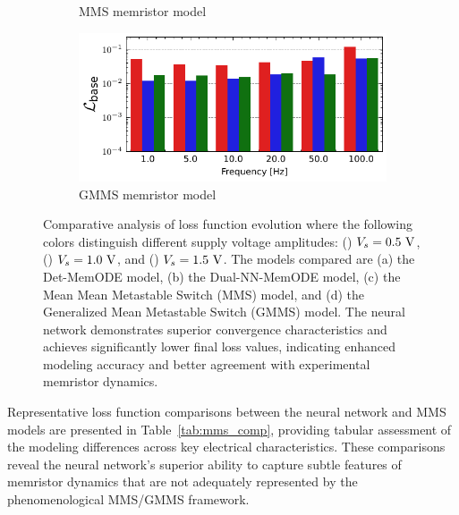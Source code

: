 \documentclass[11pt, oneside]{article}
\begin{document}
\begin{figure}[htbp!]
\begin{subfigure}[c]{0.48\linewidth}
        \caption{MMS memristor model}
    \end{subfigure}
    \begin{subfigure}[c]{0.48\linewidth}
        \centering
        \includegraphics[width=\linewidth]{mms_results/loss_per_freq_GMMS Model.pdf}
        \caption{GMMS memristor model}
    \end{subfigure}
    \caption{Comparative analysis of loss function evolution where the following colors distinguish different supply voltage amplitudes: (\redbar{}) $V_s=0.5\rm \ V$, (\bluebar{}) $V_s=1.0\rm \ V$, and (\greenbar{}) $V_s=1.5\rm \ V$. The models compared are (a) the Det-MemODE model, (b) the Dual-NN-MemODE model, (c) the Mean Mean Metastable Switch (MMS) model, and (d) the Generalized Mean Metastable Switch (GMMS) model. The neural network demonstrates superior convergence characteristics and achieves significantly lower final loss values, indicating enhanced modeling accuracy and better agreement with experimental memristor dynamics.}

    \label{fig:comparison_mms}
\end{figure}

Representative loss function comparisons between the neural network and MMS models are presented in Table~\ref{tab:mms_comp}, providing tabular assessment of the modeling differences across key electrical characteristics. These comparisons reveal the neural network's superior ability to capture subtle features of memristor dynamics that are not adequately represented by the phenomenological MMS/GMMS framework.
\end{document}
